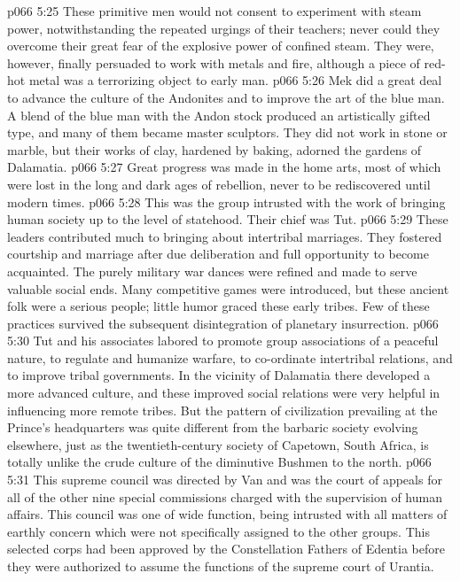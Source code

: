 \vs p066 5:25 These primitive men would not consent to experiment with steam power, notwithstanding the repeated urgings of their teachers; never could they overcome their great fear of the explosive power of confined steam. They were, however, finally persuaded to work with metals and fire, although a piece of red\hyp{}hot metal was a terrorizing object to early man.
\vs p066 5:26 Mek did a great deal to advance the culture of the Andonites and to improve the art of the blue man. A blend of the blue man with the Andon stock produced an artistically gifted type, and many of them became master sculptors. They did not work in stone or marble, but their works of clay, hardened by baking, adorned the gardens of Dalamatia.
\vs p066 5:27 Great progress was made in the home arts, most of which were lost in the long and dark ages of rebellion, never to be rediscovered until modern times.
\pc \vs p066 5:28 \bibnobreakspace {} This was the group intrusted with the work of bringing human society up to the level of statehood. Their chief was Tut.
\vs p066 5:29 These leaders contributed much to bringing about intertribal marriages. They fostered courtship and marriage after due deliberation and full opportunity to become acquainted. The purely military war dances were refined and made to serve valuable social ends. Many competitive games were introduced, but these ancient folk were a serious people; little humor graced these early tribes. Few of these practices survived the subsequent disintegration of planetary insurrection.
\vs p066 5:30 Tut and his associates labored to promote group associations of a peaceful nature, to regulate and humanize warfare, to co\hyp{}ordinate intertribal relations, and to improve tribal governments. In the vicinity of Dalamatia there developed a more advanced culture, and these improved social relations were very helpful in influencing more remote tribes. But the pattern of civilization prevailing at the Prince’s headquarters was quite different from the barbaric society evolving elsewhere, just as the twentieth\hyp{}century society of Capetown, South Africa, is totally unlike the crude culture of the diminutive Bushmen to the north.
\pc \vs p066 5:31 \bibnobreakspace {} This supreme council was directed by Van and was the court of appeals for all of the other nine special commissions charged with the supervision of human affairs. This council was one of wide function, being intrusted with all matters of earthly concern which were not specifically assigned to the other groups. This selected corps had been approved by the Constellation Fathers of Edentia before they were authorized to assume the functions of the supreme court of Urantia.
